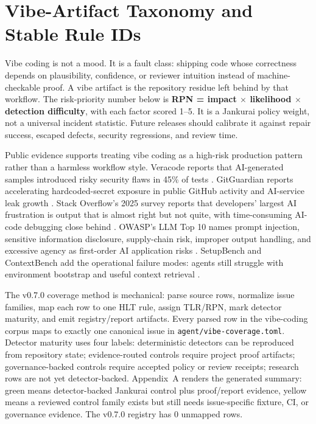 \section{Vibe-Artifact Taxonomy and Stable Rule IDs}

Vibe coding is not a mood. It is a fault class: shipping code whose correctness depends on plausibility, confidence, or reviewer intuition instead of machine-checkable proof. A vibe artifact is the repository residue left behind by that workflow. The risk-priority number below is \textbf{RPN = impact $\times$ likelihood $\times$ detection difficulty}, with each factor scored 1--5. It is a Jankurai policy weight, not a universal incident statistic. Future releases should calibrate it against repair success, escaped defects, security regressions, and review time.

Public evidence supports treating vibe coding as a high-risk production pattern rather than a harmless workflow style. Veracode reports that AI-generated samples introduced risky security flaws in 45\% of tests \cite{veracodeGenaiCodeSecurity2025}. GitGuardian reports accelerating hardcoded-secret exposure in public GitHub activity and AI-service leak growth \cite{gitguardianSecretsSprawl2026,gitguardianSecretsSprawl2026Blog}. Stack Overflow's 2025 survey reports that developers' largest AI frustration is output that is almost right but not quite, with time-consuming AI-code debugging close behind \cite{stackOverflowAISurvey2025}. OWASP's LLM Top 10 names prompt injection, sensitive information disclosure, supply-chain risk, improper output handling, and excessive agency as first-order AI application risks \cite{owaspLlmTopTen2025}. SetupBench and ContextBench add the operational failure modes: agents still struggle with environment bootstrap and useful context retrieval \cite{setupBench2025,contextBench2026}.

The v0.7.0 coverage method is mechanical: parse source rows, normalize issue families, map each row to one HLT rule, assign TLR/RPN, mark detector maturity, and emit registry/report artifacts. Every parsed row in the vibe-coding corpus maps to exactly one canonical issue in \texttt{agent/vibe-coverage.toml}. Detector maturity uses four labels: deterministic detectors can be reproduced from repository state; evidence-routed controls require project proof artifacts; governance-backed controls require accepted policy or review receipts; research rows are not yet detector-backed. Appendix~A renders the generated summary: green means detector-backed Jankurai control plus proof/report evidence, yellow means a reviewed control family exists but still needs issue-specific fixture, CI, or governance evidence. The v0.7.0 registry has 0 unmapped rows.

